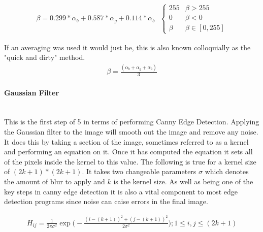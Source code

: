 \begin{flushleft}
            \begin{gather*}
                \beta = 0.299 * \alpha_{b} + 0.587 * \alpha_{g} + 0.114 * \alpha_{b}
                \text{ }
                \begin{cases}
                    255 & \beta > 255 \\
                    0 & \beta < 0 \\
                    \beta & \beta \in [0, 255]
                \end{cases}
            \end{gather*}
            
            \BK

            If an averaging was used it would just be, this is also known colloquially as the "quick and dirty" method. \\ \bk
            \begin{gather*}
                    \beta = \frac {(\alpha_{b} + \alpha_{g} + \alpha_{b})}{3}
            \end{gather*}

            \bk
            \paragraph{Gaussian Filter} \mbox{} \\
            This is the first step of 5 in terms of performing Canny Edge Detection. Applying the Gaussian filter to the image will smooth out the image and remove any noise. It does this by taking a section
            of the image, sometimes referred to as a kernel and performing an equation on it. Once it has computed the equation it sets all of the pixels inside the kernel to this value. The following is true 
            for a kernel size of $(2k + 1) * (2k + 1)$. It takes two changeable parameters $\sigma$ which denotes the amount of blur to apply and $k$ is the kernel size. As well as being one of the key steps in canny edge detection it is also a vital component to most edge detection programs since noise can caise errors in the final image.\\ \bk
            
            \begin{gather*}
                H_{ij} = \frac{1}{
                    2\pi\sigma^{2}
                } \exp \bigg(
                    -\frac{
                        (i - (k + 1))^{2} + (j - (k + 1))^{2}
                    }
                    {
                        2\sigma^{2}
                    }
                \bigg);1\leq i, j \leq(2k+1)
            \end{gather*}


\end{flushleft}
